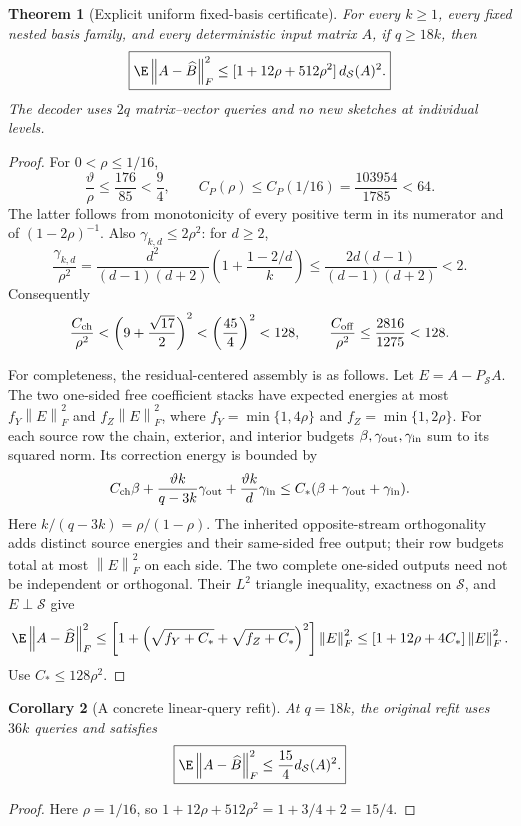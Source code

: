 \documentclass[11pt,oneside,openany,a4paper]{book}
\numberwithin{equation}{chapter}
\newtheorem{theorem}{Theorem}[chapter]
\newtheorem{corollary}[theorem]{Corollary}
\theoremstyle{definition}
\theoremstyle{remark}
\newcommand{\F}[1]{\left\lVert#1\right\rVert_F}
\begin{document}
\begin{theorem}[Explicit uniform fixed-basis certificate]
For every $k\ge1$, every fixed nested basis family, and every deterministic
input matrix $A$, if $q\ge18k$, then
\[
 \boxed{\E\F{A-\widehat B}^2
 \le[1+12\rho+512\rho^2]\,d_{\mathcal S}(A)^2.}
\]
The decoder uses $2q$ matrix--vector queries and no new sketches at
individual levels.
\end{theorem}
\begin{proof}
For $0<\rho\le1/16$,
\[
 \frac{\vartheta}{\rho}\le\frac{176}{85}<\frac94,\qquad
 C_P(\rho)\le C_P(1/16)=\frac{103954}{1785}<64.
\]
The latter follows from monotonicity of every positive term in its
numerator and of $(1-2\rho)^{-1}$.
Also $\gamma_{k,d}\le2\rho^2$: for $d\ge2$,
\[
 \frac{\gamma_{k,d}}{\rho^2}
 =\frac{d^2}{(d-1)(d+2)}
       \left(1+\frac{1-2/d}{k}\right)
 \le\frac{2d(d-1)}{(d-1)(d+2)}<2.
\]
Consequently
\[
 \frac{C_{\rm ch}}{\rho^2}
 <\left(9+\frac{\sqrt{17}}2\right)^2
 <\left(\frac{45}4\right)^2<128,\qquad
 \frac{C_{\rm off}}{\rho^2}
 \le\frac{2816}{1275}<128.
\]

For completeness, the residual-centered assembly is as follows.
Let $E=A-P_{\mathcal S}A$. The two one-sided free coefficient stacks
have expected energies at most $f_Y\F E^2$ and $f_Z\F E^2$, where
$f_Y=\min\{1,4\rho\}$ and $f_Z=\min\{1,2\rho\}$.
For each source row the chain, exterior, and interior budgets
$\beta,\gamma_{\rm out},\gamma_{\rm in}$ sum to its squared norm.
Its correction energy is bounded by
\[
 C_{\rm ch}\beta+
 \frac{\vartheta k}{q-3k}\gamma_{\rm out}+
 \frac{\vartheta k}{d}\gamma_{\rm in}
 \le C_*(\beta+\gamma_{\rm out}+\gamma_{\rm in}).
\]
Here $k/(q-3k)=\rho/(1-\rho)$.
The inherited opposite-stream orthogonality adds distinct source
energies and their same-sided free output; their row budgets total
at most $\F E^2$ on each side.
The two complete one-sided outputs need not be independent or orthogonal.
Their $L^2$ triangle inequality, exactness on $\mathcal S$, and
$E\perp\mathcal S$ give
\[
 \E\F{A-\widehat B}^2
 \le\left[1+
   \left(\sqrt{f_Y+C_*}+\sqrt{f_Z+C_*}\right)^2\right]\F E^2
 \le[1+12\rho+4C_*]\F E^2.
\]
Use $C_*\le128\rho^2$.
\end{proof}

\begin{corollary}[A concrete linear-query refit]
At $q=18k$, the original refit uses $36k$ queries and satisfies
\[
 \boxed{\E\F{A-\widehat B}^2\le\frac{15}{4}d_{\mathcal S}(A)^2.}
\]
\end{corollary}
\begin{proof}
Here $\rho=1/16$, so
$1+12\rho+512\rho^2=1+3/4+2=15/4$.
\end{proof}
\end{document}
